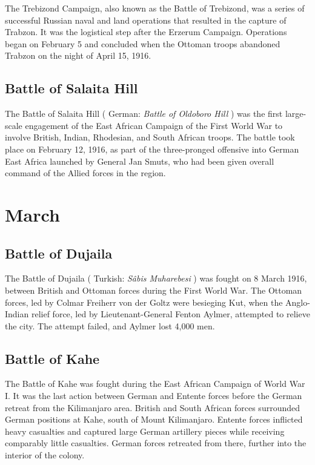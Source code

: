 \documentclass[a4paper,]{book}
\begin{document}
The Trebizond Campaign, also known as the Battle of Trebizond, was a series of successful Russian naval and land operations that resulted in the capture of Trabzon. It was the logistical step after the Erzerum Campaign. Operations began on February 5 and concluded when the Ottoman troops abandoned Trabzon on the night of April 15, 1916.

\section{Battle of Salaita Hill}

The Battle of Salaita Hill ( German: \textit{Battle of Oldoboro Hill} ) was the first large-scale engagement of the East African Campaign of the First World War to involve British, Indian, Rhodesian, and South African troops. The battle took place on February 12, 1916, as part of the three-pronged offensive into German East Africa launched by General Jan Smuts, who had been given overall command of the Allied forces in the region. 


\chapter{March}

\section{Battle of Dujaila}

The Battle of Dujaila ( Turkish: \textit{Sâbis Muharebesi} ) was fought on 8 March 1916, between British and Ottoman forces during the First World War. The Ottoman forces, led by Colmar Freiherr von der Goltz were besieging Kut, when the Anglo-Indian relief force, led by Lieutenant-General Fenton Aylmer, attempted to relieve the city. The attempt failed, and Aylmer lost 4,000 men. 

\section{Battle of Kahe}

The Battle of Kahe was fought during the East African Campaign of World War I. It was the last action between German and Entente forces before the German retreat from the Kilimanjaro area. British and South African forces surrounded German positions at Kahe, south of Mount Kilimanjaro. Entente forces inflicted heavy casualties and captured large German artillery pieces while receiving comparably little casualties. German forces retreated from there, further into the interior of the colony. 
\end{document}
